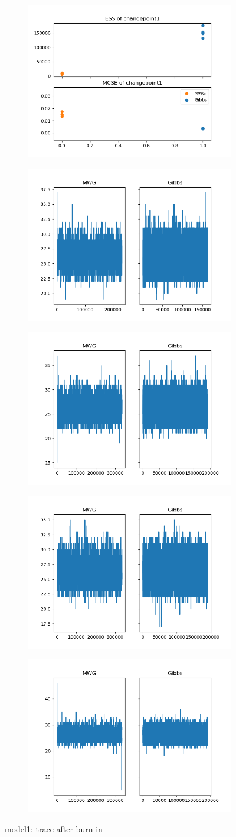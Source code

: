 \begin{figure}[h]
    \centering
    \begin{subfigure}
    	\centering
        \includegraphics[width=0.3\linewidth]{../../plots/ess_se_M2_N50_NMCMC1_seed0_diffind2.png}
    \end{subfigure}
    \begin{subfigure}
        \centering
    	\includegraphics[width=0.3\linewidth]{../../plots/Trace_post_burnin_M2_N50_NMCMC1_seed1_diffind2.png}
	\end{subfigure}
	\begin{subfigure}
	    \centering
    	\includegraphics[width=0.3\linewidth]{../../plots/Trace_post_burnin_M2_N50_NMCMC1_seed2_diffind2.png}
	\end{subfigure}
	\begin{subfigure}
	    \centering
    	\includegraphics[width=0.3\linewidth]{../../plots/Trace_post_burnin_M2_N50_NMCMC1_seed3_diffind2.png}
	\end{subfigure}
	\begin{subfigure}
	    \centering
    	\includegraphics[width=0.3\linewidth]{../../plots/Trace_post_burnin_M2_N50_NMCMC1_seed4_diffind2.png}
	\end{subfigure}
	\caption{model1: trace after burn in}
\end{figure}

